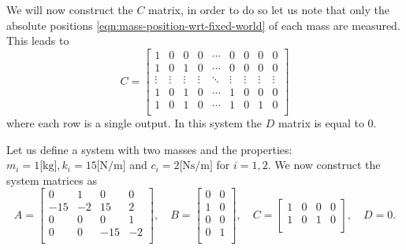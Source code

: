 We will now construct the $C$ matrix, in order to do so let us note that only the absolute positions \eqref{eqn:mass-position-wrt-fixed-world} of each mass are measured. This leads to
\begin{equation}\label{eqn:msd-C}
    C = 
    \begin{bmatrix}
        1 & 0 & 0 & 0 & \cdots & 0 & 0 & 0 & 0 \\
        1 & 0 & 1 & 0 & \cdots & 0 & 0 & 0 & 0 \\
        \vdots & \vdots & \vdots & \vdots & \ddots & \vdots & \vdots & \vdots & \vdots \\
        1 & 0 & 1 & 0 & \cdots & 1 & 0 & 0 & 0 \\
        1 & 0 & 1 & 0 & \cdots & 1 & 0 & 1 & 0 \\
    \end{bmatrix}
\end{equation}
where each row is a single output. In this system the $D$ matrix is equal to $0$.\\ 
\begin{example}\label{ex:system}
    Let us define a system with two masses and the properties: $m_i=1 \text{[kg]}, k_i=15\text{[N/m]}$ and $c_i=2 \text{[Ns/m]}$ for $i=1,2$. We now construct the system matrices as
    \begin{equation*}
    A =
    \begin{bmatrix}
        0 & 1 & 0 & 0 \\
        -15 & -2 & 15 & 2 \\
        0 & 0 & 0 & 1 \\
        0 & 0 & -15 & -2 \\
    \end{bmatrix}, \quad
    B = 
    \begin{bmatrix}
        0 & 0 \\
        1 & 0 \\
        0 & 0 \\
        0 & 1 \\
    \end{bmatrix}, \quad
    C =
    \begin{bmatrix}
        1 & 0 & 0 & 0 \\
        1 & 0 & 1 & 0 \\
    \end{bmatrix}, \quad
    D = 0.
    \end{equation*}
\end{example}